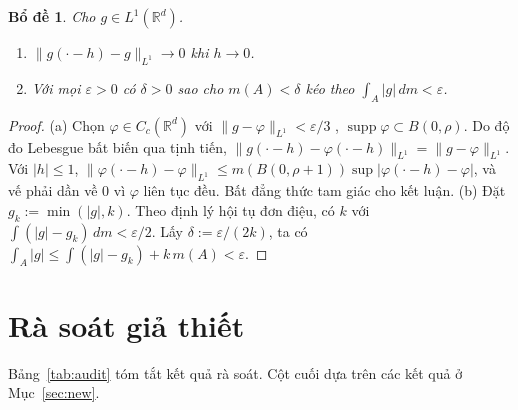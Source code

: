 \documentclass[12pt,a4paper]{article}
\theoremstyle{plain}
\newtheorem{bd}{Bổ đề}
\theoremstyle{definition}
\newcommand{\R}{\mathbb{R}}
\newcommand{\dm}{\,dm}
\begin{document}
\begin{bd}\label{bd:1}
Cho $g\in L^1(\R^d)$.
\begin{enumerate}[label=(\alph*)]
\item $\|g(\cdot-h)-g\|_{L^1}\to0$ khi $h\to0$.
\item Với mọi $\varepsilon>0$ có $\delta>0$ sao cho $m(A)<\delta$ kéo theo $\int_A|g|\dm<\varepsilon$.
\end{enumerate}
\end{bd}
\begin{proof}
(a) Chọn $\varphi\in C_c(\R^d)$ với $\|g-\varphi\|_{L^1}<\varepsilon/3$ \cite[Định lý 3.14]{rudin}, $\operatorname{supp}\varphi\subset B(0,\rho)$. Do độ đo Lebesgue bất biến qua tịnh tiến, $\|g(\cdot-h)-\varphi(\cdot-h)\|_{L^1}=\|g-\varphi\|_{L^1}$. Với $|h|\le1$, $\|\varphi(\cdot-h)-\varphi\|_{L^1}\le m(B(0,\rho+1))\sup|\varphi(\cdot-h)-\varphi|$, và vế phải dần về $0$ vì $\varphi$ liên tục đều. Bất đẳng thức tam giác cho kết luận.
(b) Đặt $g_k:=\min(|g|,k)$. Theo định lý hội tụ đơn điệu, có $k$ với $\int(|g|-g_k)\dm<\varepsilon/2$. Lấy $\delta:=\varepsilon/(2k)$, ta có $\int_A|g|\le\int(|g|-g_k)+k\,m(A)<\varepsilon$.
\end{proof}

\section{Rà soát giả thiết}\label{sec:audit}

Bảng~\ref{tab:audit} tóm tắt kết quả rà soát. Cột cuối dựa trên các kết quả ở Mục~\ref{sec:new}.
\end{document}
